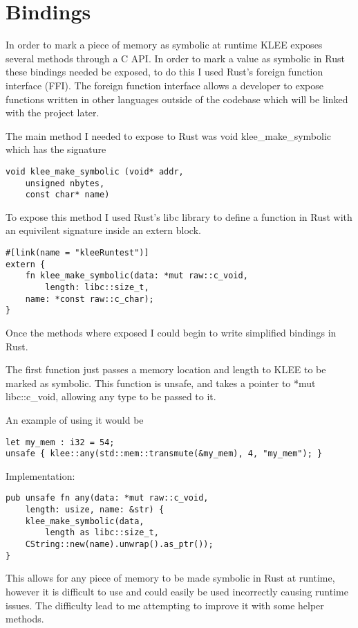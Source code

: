 \documentclass{report}
\begin{document}
\chapter {Bindings}

In order to mark a piece of memory as symbolic at runtime KLEE exposes several methods through a C API. In order to mark a value as symbolic in Rust these bindings needed be exposed, to do this I used Rust's foreign function interface (FFI). The foreign function interface allows a developer to expose functions written in other languages outside of the codebase which will be linked with the project later.

The main method I needed to expose to Rust was void klee\_make\_symbolic which has the signature
\begin{lstlisting}
void klee_make_symbolic	(void* addr,
	unsigned nbytes,
	const char* name)
\end{lstlisting}

To expose this method I used Rust's libc library to define a function in Rust with an equivilent signature inside an extern block.

\begin{lstlisting}
#[link(name = "kleeRuntest")]
extern {
    fn klee_make_symbolic(data: *mut raw::c_void,
    	length: libc::size_t,
	name: *const raw::c_char);
}
\end{lstlisting}

Once the methods where exposed I could begin to write simplified bindings in Rust.

The first function just passes a memory location and length to KLEE to be marked as symbolic. This function is unsafe, and takes a pointer to *mut libc::c\_void, allowing any type to be passed to it.

An example of using it would be
\begin {lstlisting}
let my_mem : i32 = 54;
unsafe { klee::any(std::mem::transmute(&my_mem), 4, "my_mem"); }
\end{lstlisting}

Implementation:
\begin {lstlisting}
pub unsafe fn any(data: *mut raw::c_void,
	length: usize, name: &str) {
    klee_make_symbolic(data,
    	length as libc::size_t,
	CString::new(name).unwrap().as_ptr());
}
\end{lstlisting}

This allows for any piece of memory to be made symbolic in Rust at runtime, however it is difficult to use and could easily be used incorrectly causing runtime issues. The difficulty lead to me attempting to improve it with some helper methods.
\end{document}
